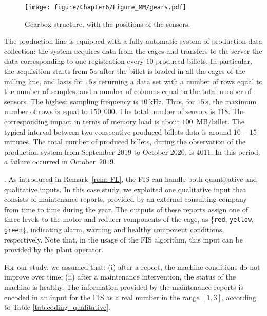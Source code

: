 \begin{figure}[ht]
    \centering
    \texttt{[image: figure/Chapter6/Figure\_MM/gears.pdf]}
    \caption{Gearbox structure, with the positions of the sensors.}
    \label{fig_failure_spot}
\end{figure}
The production line is equipped with a  fully automatic system of production data collection: the system acquires data from the cages and transfers to the server the data corresponding to one registration every $10$ produced billets. In particular, the acquisition starts from $5\,\text{s}$ after the billet is loaded in all the cages of the milling line, and lasts for $15\,\text{s}$ returning a data set with a number of rows equal to the number of samples, and a number of columns equal to the total number of sensors. The highest sampling frequency is $10~\text{kHz}$. Thus, for $15\,\text{s}$, the maximum number of rows is equal to $150,000$. The total number of sensors is $118$. The corresponding impact in terms of memory load is about $100$~MB/billet. The typical interval between two consecutive produced billets data is around $10-15$ minutes.
The total number of produced billets, during the observation of the production system from September 2019 to October 2020, is $4011$. In this period, a failure occurred in October~$2019$.

.
As introduced in Remark~\ref{rem: FL}, the FIS can handle both quantitative and qualitative inputs.  In this case study, we exploited one qualitative input that consists of maintenance reports, provided by an external consulting company from time to time during the year.  The outputs of these reports assign one of three levels to the motor and reducer components of the {cage}, as \{\texttt{red}, \texttt{yellow}, \texttt{green}\}, indicating alarm, warning and healthy component conditions, respectively. Note that, in the usage of the FIS algorithm, this input can be provided by the plant operator.

For our study, we assumed that: (i) after a report, the machine conditions do not improve over time; (ii) after a maintenance intervention, the status of the machine is healthy.
The information provided by the maintenance reports is encoded in an input for the FIS as a real number in the range $[1, 3]$, according to Table \ref{tab:coding_qualitative}.

